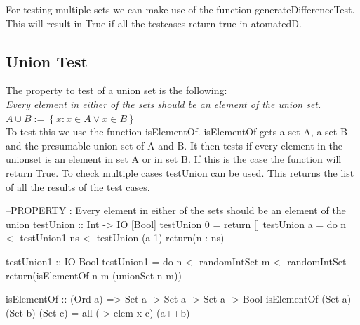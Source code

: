 \documentclass{article}
\begin{document}
For testing multiple sets we can make use of the function generateDifferenceTest. This will result in True if all the testcases return true in atomatedD.


\subsection*{Union Test}
The property to test of a union set is the following: \\ \emph{
Every element in either of the sets should be an element of the union set.
$ A \cup B := \left\{ x: x \in A \lor x \in B\right\} $ }\\

To test this we use the function isElementOf. isElementOf gets a set A, a set B and the presumable union set of A and B. It then tests if every element in the unionset is an element in set A or in set B. If this is the case the function will return True. To check multiple cases testUnion can be used. This returns the list of all the results of the test cases.

\begin{code}
--PROPERTY : Every element in either of the sets should be an element of the union
testUnion :: Int -> IO [Bool]
testUnion 0 = return []
testUnion a = do 	n <- testUnion1
			ns <- testUnion (a-1)			
			return(n : ns)

testUnion1 :: IO Bool
testUnion1 = do 	n <- randomIntSet
			m <- randomIntSet
			return(isElementOf n m (unionSet n m)) 

isElementOf :: (Ord a) => Set a -> Set a -> Set a -> Bool
isElementOf (Set a) (Set b) (Set c) = all (\x -> elem x c) (a++b)
\end{code}
\end{document}
